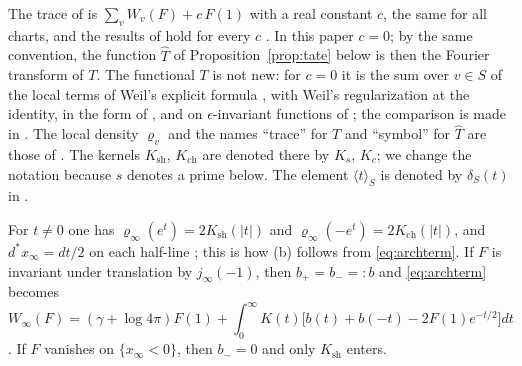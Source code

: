\documentclass[11pt]{amsart}
\theoremstyle{definition}
\newcommand{\Ksh}{K_{\mathrm{sh}}}
\newcommand{\Kch}{K_{\mathrm{ch}}}
\begin{document}
The trace of \cite[Definition~5.4]{Companion} is $\sum_vW_v(F)+c\,F(1)$ with
a real constant $c$, the same for all charts, and the results of
\cite{Companion} hold for every $c$ \cite[Convention~5.8]{Companion}. In this
paper $c=0$; by the same convention, the function $\widehat T$ of
Proposition~\ref{prop:tate} below is then the Fourier transform of $T$. The
functional $T$ is not new: for $c=0$ it is the sum over $v\in S$ of the local
terms of Weil's explicit formula \cite{Weil1952}, with Weil's regularization
at the identity, in the form of \cite[Appendix~II]{Connes99}, and on
$\epsilon$-invariant functions of \cite[Theorem~4]{Connes99};
the comparison is made in \cite[Section~1 and after
Convention~5.5]{Companion}. The local density $\varrho_v$ and the names
``trace'' for $T$ and ``symbol'' for $\widehat T$ are those of
\cite{Companion}. The kernels $\Ksh$, $\Kch$ are denoted there by $K_s$,
$K_c$; we change the notation because $s$ denotes a prime below. The element
$\langle t\rangle_S$ is denoted by $\delta_S(t)$ in \cite{Companion}.

For $t\ne0$ one has $\varrho_\infty(e^{t})=2\Ksh(|t|)$ and
$\varrho_\infty(-e^{t})=2\Kch(|t|)$, and $d^*x_\infty=dt/2$ on each half-line
\cite[(9), (27), (33)]{Companion}; this is how (b) follows from \eqref{eq:archterm}. If
$F$ is invariant under translation by $j_\infty(-1)$, then $b_+=b_-=:b$ and
\eqref{eq:archterm} becomes
\begin{equation}\label{eq:archeven}
  W_\infty(F)=(\gamma+\log4\pi)F(1)+\int_0^\infty
    K(t)\bigl[b(t)+b(-t)-2F(1)e^{-t/2}\bigr]dt
\end{equation}
\cite[(32)]{Companion}. If $F$ vanishes on $\{x_\infty<0\}$, then $b_-=0$ and
only $\Ksh$ enters.
\end{document}
